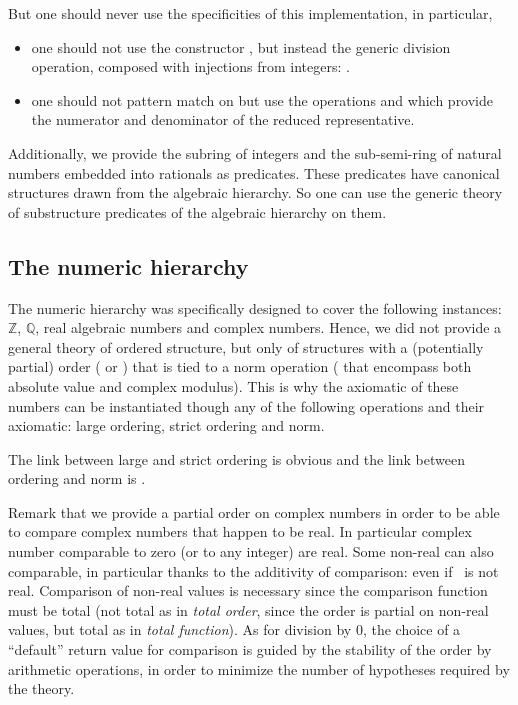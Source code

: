 But one should never use the specificities of this implementation, in
particular,
\begin{itemize}
\item one should not use the constructor , but instead the
  generic division operation, composed with injections from integers:
  .
\item one should not pattern match on  but use the operations
   and  which provide the numerator and denominator of
  the reduced representative.
\end{itemize}

Additionally, we provide the subring of integers  and the
sub-semi-ring of natural numbers  embedded into rationals as
predicates. These predicates have canonical structures drawn from the
algebraic hierarchy. So one can use the generic theory of substructure
predicates of the algebraic hierarchy on them.


\subsection{The numeric hierarchy}
\label{sec:numeric-hierarchy}

The numeric hierarchy was specifically designed to cover the following
instances: $\mathbb{Z}$, $\mathbb{Q}$, real algebraic numbers and
complex numbers. Hence, we did not provide a general theory of ordered
structure, but only of structures with a (potentially partial) order
(\C{_ <= _} or \C{_ < _}) that is tied to a norm operation (
that encompass both absolute value and complex modulus). This is why
the axiomatic of these numbers can be instantiated though any of the
following operations and their axiomatic: large ordering, strict
ordering and norm.

The link between large and strict ordering is obvious and the link
between ordering and norm is .

Remark that we provide a partial order on complex numbers in order to
be able to compare complex numbers that happen to be real. In
particular complex number comparable to zero (or to any integer) are
real. Some non-real can also comparable, in particular thanks to the
additivity of comparison:  even if~ is
not real. Comparison of non-real values is necessary since the
comparison function must be total (not total as in \emph{total order},
since the order is partial on non-real values, but total as in
\emph{total function}). As for division by $0$, the choice of a
``default'' return value for comparison is guided by the stability of
the order by arithmetic operations, in order to minimize the number of
hypotheses required by the theory.

